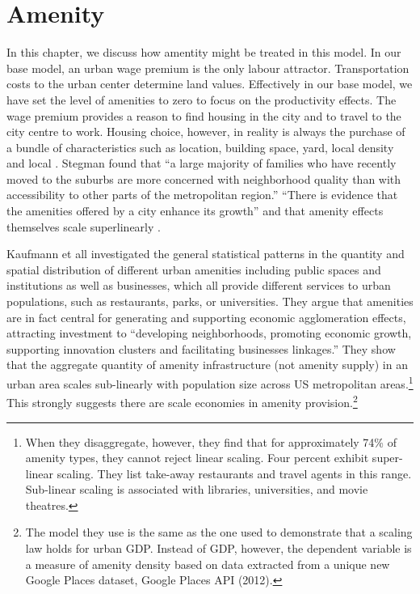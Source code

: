 \chapter{Amenity}\label{chapter-amenity}

In this chapter, we discuss how amentity might be treated in this model. 
In our base model,  an urban wage premium is the only labour attractor. Transportation costs to the urban center  determine land values. Effectively in our base model, we have set the level of amenities to zero  to focus on the productivity effects. The wage premium provides a reason to find housing in the city and to travel to the city centre to work. Housing choice, however, in reality is always the purchase of a bundle of characteristics such as location, building space, yard, local density and local . Stegman  found that ``a large majority of families who have recently moved to the suburbs are more concerned with neighborhood quality than with accessibility to other parts of the metropolitan region.'' 
``There is evidence that the amenities offered by a city enhance its growth'' \cite{clarkAmenitiesDriveUrban2002, falckPhantomOperaCultural2011a} and that amenity effects themselves scale superlinearly \cite{kraemerCulturalSustainabilityUS2022}.

Kaufmann et all \cite{kaufmannScalingUrbanAmenities2022} investigated the general statistical patterns in the quantity and spatial distribution of different urban amenities including public spaces and institutions as well as businesses, which all provide different services to urban populations, such as restaurants, parks, or universities.  They argue that amenities are in fact central for generating and supporting economic agglomeration effects, attracting investment to ``developing neighborhoods, promoting economic growth, supporting innovation clusters and facilitating businesses linkages.'' 
They show that the aggregate quantity of amenity infrastructure (not amenity supply)  in an urban area scales sub-linearly with population size across US metropolitan areas.\footnote{When they disaggregate, however, they find that for approximately 74\% of amenity types, they cannot reject linear scaling. Four percent exhibit super-linear scaling. They list take-away restaurants and travel agents in this range. Sub-linear scaling is associated with libraries, universities, and movie theatres.} This strongly suggests there are scale economies in amenity provision.\footnote{The model they use is the same as the one used to demonstrate that a scaling law holds for urban GDP. Instead of GDP, however, the dependent variable is a measure of amenity density based on data extracted from a unique new Google Places dataset, Google Places API (2012).} 


